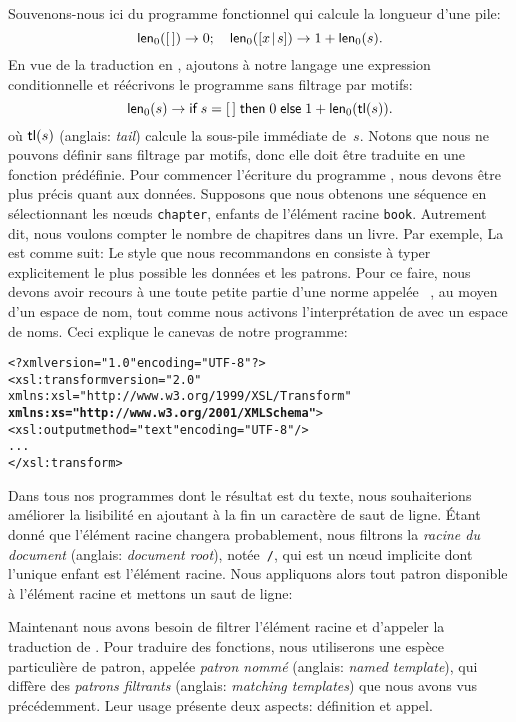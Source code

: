 
Souvenons-nous ici du programme fonctionnel qui calcule la longueur
d'une pile:
\begin{equation*}
\textsf{len}_0([\,]) \rightarrow 0;\quad
\textsf{len}_0([{x}\!\mid\!{s}]) \rightarrow 1 + \textsf{len}_0(s).
\end{equation*}
En vue de la traduction en \XSLT, ajoutons à notre langage une
expression conditionnelle et réécrivons le programme sans filtrage par motifs:
\begin{equation}
\textsf{len}_0(s) \rightarrow \textsf{if} \; s = [\,] \; \textsf{then} \; 0 \;
\textsf{else} \; 1 + \textsf{len}_0(\textsf{tl}(s)).
\label{def_len0_xslt}
\end{equation}
où \(\textsf{tl}(s)\) (anglais: \emph{tail}) calcule la sous-pile
immédiate de~\(s\). Notons que nous ne pouvons définir 
sans filtrage par motifs, donc elle doit être traduite en une fonction
prédéfinie. Pour commencer l'écriture du programme \XSLT, nous devons
être plus précis quant aux données. Supposons que nous obtenons une
séquence en sélectionnant les nœuds \texttt{chapter}, enfants de
l'élément racine \texttt{book}. Autrement dit, nous voulons compter le
nombre de chapitres dans un livre. Par exemple,
\noindent La \DTD est comme suit:
Le style que nous recommandons en \XSLT consiste à typer explicitement
le plus possible les données et les patrons. Pour ce faire, nous
devons avoir recours à une toute petite partie d'une norme appelée
\XMLSchema~\citep{Walmsley_2002}, au moyen d'un espace de nom, tout
comme nous activons l'interprétation de \XSLT avec un espace de noms.
Ceci explique le canevas de notre programme:
\begin{alltt}
\small<?xml version="1.0" encoding="UTF-8"?>
<xsl:transform version="2.0"
               xmlns:xsl="http://www.w3.org/1999/XSL/Transform"
               \textbf{xmlns:xs="http://www.w3.org/2001/XMLSchema"}>
  <xsl:output method="text" encoding="UTF-8"/>
  ...
</xsl:transform>
\end{alltt}
Dans tous nos programmes \XSLT dont le résultat est du texte, nous
souhaiterions améliorer la lisibilité en ajoutant à la fin un
caractère de saut de ligne. Étant donné que l'élément racine changera
probablement, nous filtrons la \emph{racine du document} (anglais:
\emph{document root}), notée~\texttt{/}, qui est un nœud implicite
dont l'unique enfant est l'élément racine. Nous appliquons alors tout
patron disponible à l'élément racine et mettons un saut de ligne:
Maintenant nous avons besoin de filtrer l'élément racine et d'appeler
la traduction de . Pour traduire des fonctions, nous
utiliserons une espèce particulière de patron, appelée \emph{patron
  nommé} (anglais: \emph{named template}), qui diffère des
\emph{patrons filtrants} (anglais: \emph{matching templates}) que nous
avons vus précédemment. Leur usage présente deux aspects: définition
et appel.

